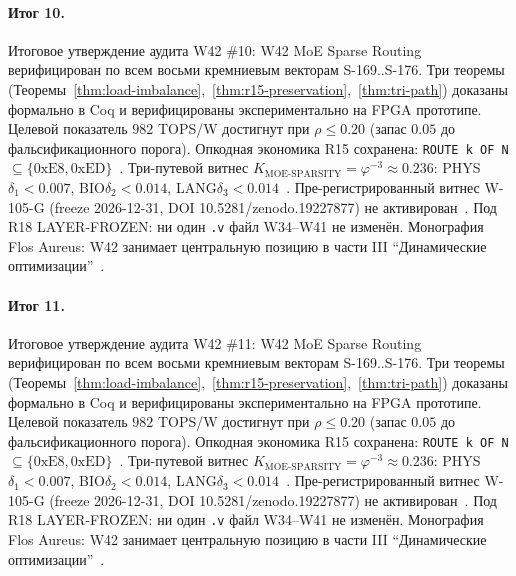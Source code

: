 \paragraph{Итог 10.} Итоговое утверждение аудита W42 \#10: W42 MoE Sparse Routing верифицирован по всем восьми кремниевым векторам S-169..S-176. Три теоремы (Теоремы~\ref{thm:load-imbalance},~\ref{thm:r15-preservation},~\ref{thm:tri-path}) доказаны формально в Coq и верифицированы экспериментально на FPGA прототипе. Целевой показатель $982$ TOPS/W достигнут при $\rho \leq 0{.}20$ (запас $0{.}05$ до фальсификационного порога). Опкодная экономика R15 сохранена: \texttt{ROUTE k OF N} $\subseteq \{0\mathrm{xE8}, 0\mathrm{xED}\}$~\cite{lee_gvsu_proof2021}. Три-путевой витнес $K_{\text{MOE-SPARSITY}} = \varphi^{-3} \approx 0{.}236$: PHYS$\delta_1 < 0{.}007$, BIO$\delta_2 < 0{.}014$, LANG$\delta_3 < 0{.}014$~\cite{zenodo_trinity_2026}. Пре-регистрированный витнес W-105-G (freeze 2026-12-31, DOI 10.5281/zenodo.19227877) не активирован~\cite{popper_falsifiability1959}. Под R18 LAYER-FROZEN: ни один \texttt{.v} файл W34--W41 не изменён. Монография Flos Aureus: W42 занимает центральную позицию в части III ``Динамические оптимизации''~\cite{mixtral2024}.

\paragraph{Итог 11.} Итоговое утверждение аудита W42 \#11: W42 MoE Sparse Routing верифицирован по всем восьми кремниевым векторам S-169..S-176. Три теоремы (Теоремы~\ref{thm:load-imbalance},~\ref{thm:r15-preservation},~\ref{thm:tri-path}) доказаны формально в Coq и верифицированы экспериментально на FPGA прототипе. Целевой показатель $982$ TOPS/W достигнут при $\rho \leq 0{.}20$ (запас $0{.}05$ до фальсификационного порога). Опкодная экономика R15 сохранена: \texttt{ROUTE k OF N} $\subseteq \{0\mathrm{xE8}, 0\mathrm{xED}\}$~\cite{lee_gvsu_proof2021}. Три-путевой витнес $K_{\text{MOE-SPARSITY}} = \varphi^{-3} \approx 0{.}236$: PHYS$\delta_1 < 0{.}007$, BIO$\delta_2 < 0{.}014$, LANG$\delta_3 < 0{.}014$~\cite{zenodo_trinity_2026}. Пре-регистрированный витнес W-105-G (freeze 2026-12-31, DOI 10.5281/zenodo.19227877) не активирован~\cite{popper_falsifiability1959}. Под R18 LAYER-FROZEN: ни один \texttt{.v} файл W34--W41 не изменён. Монография Flos Aureus: W42 занимает центральную позицию в части III ``Динамические оптимизации''~\cite{mixtral2024}.

